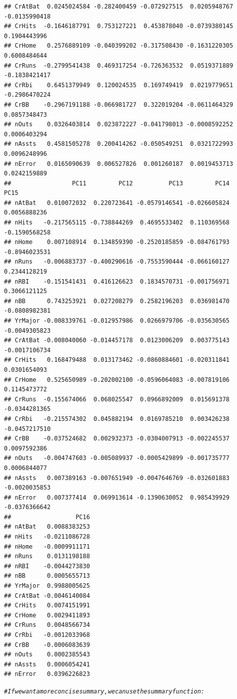 \documentclass{article}\usepackage[]{graphicx}\usepackage[]{color}
\makeatletter
\newcommand{\hlcom}[1]{\textcolor[rgb]{0.678,0.584,0.686}{\textit{#1}}}%
\newenvironment{kframe}{%
 \def\at@end@of@kframe{}%
 \ifinner\ifhmode%
  \def\at@end@of@kframe{\end{minipage}}%
  \begin{minipage}{\columnwidth}%
 \fi\fi%
 \def\FrameCommand##1{\hskip\@totalleftmargin \hskip-\fboxsep
 \colorbox{shadecolor}{##1}\hskip-\fboxsep
     \hskip-\linewidth \hskip-\@totalleftmargin \hskip\columnwidth}%
 \MakeFramed {\advance\hsize-\width
   \@totalleftmargin\z@ \linewidth\hsize
   \@setminipage}}%
 {\par\unskip\endMakeFramed%
 \at@end@of@kframe}
\newenvironment{knitrout}{}{} %
\makeatother
\begin{document}
\begin{knitrout}
\begin{kframe}
\begin{verbatim}
## CrAtBat  0.0245024584 -0.282400459 -0.072927515  0.0205948767 -0.0135990418
## CrHits  -0.1646187791  0.753127221  0.453878040 -0.0739380145  0.1904443996
## CrHome   0.2576889109 -0.040399202 -0.317508430 -0.1631220305  0.6008484644
## CrRuns  -0.2799541438  0.469317254 -0.726363532  0.0519371889 -0.1838421417
## CrRbi    0.6451379949  0.120024535  0.169749419  0.0219779651 -0.2986470224
## CrBB    -0.2967191188 -0.066981727  0.322019204 -0.0611464329  0.0857348473
## nOuts    0.0326403814  0.023872227 -0.041798013 -0.0008592252  0.0006403294
## nAssts   0.4581505278  0.200414262 -0.050549251  0.0321722993  0.0096248996
## nError   0.0165090639  0.006527826  0.001260187  0.0019453713  0.0242159889
##                 PC11         PC12          PC13         PC14          PC15
## nAtBat   0.010072032  0.220723641 -0.0579146541 -0.026605824  0.0056888236
## nHits   -0.217565115 -0.738844269  0.4695533402  0.110369568 -0.1590568258
## nHome    0.007108914  0.134859390 -0.2520185859 -0.084761793 -0.8946023531
## nRuns   -0.006883737 -0.400290616 -0.7553590444 -0.066160127  0.2344128219
## nRBI    -0.151541431  0.416126623  0.1834570731 -0.001756971  0.3066121125
## nBB      0.743253921  0.027208279  0.2582196203  0.036981470 -0.0808982381
## YrMajor -0.008339761 -0.012957986  0.0266979706 -0.035630565 -0.0049305823
## CrAtBat -0.008040060 -0.014457178  0.0123006209  0.003775143 -0.0017106734
## CrHits   0.168479488  0.013173462 -0.0860884601 -0.020311841  0.0301654093
## CrHome   0.525650989 -0.202002100 -0.0596064083 -0.007819106  0.1145473772
## CrRuns  -0.155674066  0.068025547  0.0966892009  0.015691378 -0.0344281365
## CrRbi   -0.215574302  0.045882194  0.0169785210  0.003426238 -0.0457217510
## CrBB    -0.037524682  0.002932373 -0.0304007913 -0.002245537  0.0097592386
## nOuts   -0.004747603 -0.005089937 -0.0005429899 -0.001735777  0.0006844077
## nAssts   0.007389163 -0.007651949 -0.0047646769 -0.032601883 -0.0020035853
## nError   0.007377414  0.069913614 -0.1390630052  0.985439929 -0.0376366642
##                  PC16
## nAtBat   0.0088383253
## nHits   -0.0211086728
## nHome   -0.0009911171
## nRuns    0.0131198188
## nRBI    -0.0044273830
## nBB      0.0005655713
## YrMajor  0.9988005625
## CrAtBat -0.0046140084
## CrHits   0.0074151991
## CrHome   0.0029411893
## CrRuns   0.0048566734
## CrRbi   -0.0012033968
## CrBB    -0.0006083639
## nOuts    0.0002385543
## nAssts   0.0006054241
## nError   0.0396226823
\end{verbatim}
\begin{alltt}
\hlcom{# If we want a more concise summary, we can use the summary function:}

\end{alltt}
\end{kframe}
\end{knitrout}
\end{document}
